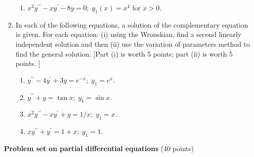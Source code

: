 \documentclass[fleqn]{article}
\begin{document}
\begin{enumerate}
\begin{enumerate}
      \item $x^{2}y^{\prime \prime }-xy^{\prime }-8y=0;\;y_{1}\left( x\right) =x^{4}$ for $x>0.$
      \end{enumerate}
    
    
    \item In each of the following equations, a solution of the complementary equation is given. For each equation: (i) using the Wronskian, find a second linearly independent solution and then (ii) use the variation of parameters method to find the general solution. [Part (i) is worth 5 points; part (ii) is worth 5 points.  ]
      \begin{enumerate}
      \item $y^{\prime \prime }-4y^{\prime }+3y=e^{-x};\;y_{1}=e^{x}.$
      
      \item $y^{\prime \prime }+y=\tan x;\;y_{1}=\sin x.$
      
      \item $x^{2}y^{\prime \prime }-xy^{\prime }+y=1/x;\;y_{1}=x.$
      
      \item $xy^{\prime \prime }+y^{\prime }=1+x;\;y_{1}=1.$
      \end{enumerate}

    
  \end{enumerate}

  \pagebreak


  \textbf{Problem set on partial differential equations} (40 points)
\end{document}
